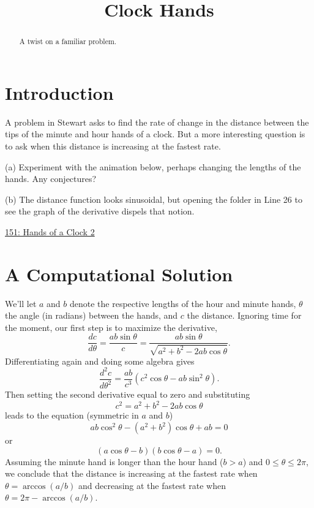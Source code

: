 \documentclass{ximera}
\title{Clock Hands}
\begin{document}
\begin{abstract}
A twist on a familiar problem.
\end{abstract}
\maketitle

\section*{Introduction}
A problem in Stewart asks to find the rate of change in the distance between the tips of the minute and hour hands of a clock. But a more interesting question is to ask when this distance is increasing at the fastest rate. 


\begin{exploration}
(a) Experiment with the animation below, perhaps changing the lengths of the hands. Any conjectures?

(b) The distance function looks sinusoidal, but opening the folder in Line 26 to see the graph of the derivative dispels that notion. 

\begin{onlineOnly}
    \begin{center}
\end{center}
\end{onlineOnly}

\href{https://www.desmos.com/calculator/pnpf5uhbre}{151: Hands of a Clock 2}


\end{exploration}

\section*{A Computational Solution}

We'll let $a$ and $b$ denote the respective lengths of the hour and minute hands, $\theta$ the angle (in radians) between the hands, and $c$ the distance. Ignoring time for the moment, our first step is to maximize the derivative,
\[
        \frac{dc}{d\theta} = \frac{ab\sin \theta}{c} = \frac{ab \sin \theta}{\sqrt{a^2+b^2-2ab\cos\theta}}.
\]
Differentiating again and doing some algebra gives
\[
       \frac{d^2c}{d\theta^2} = \frac{ab}{c^3} \left( c^2\cos\theta - ab\sin^2\theta  \right).
\]
Then setting the second derivative equal to zero and substituting 
\[
      c^2 = a^2+b^2-2ab\cos\theta
\]
leads to the equation (symmetric in $a$ and $b$)
\[
     ab \cos^2\theta - (a^2 + b^2)\cos\theta + ab = 0
\]
or
\[
              (a \cos \theta - b) (b \cos \theta - a) = 0 .
\]
Assuming the minute hand is longer than the hour hand ($b>a$) and $0\leq \theta \leq 2\pi$, we conclude that the distance is increasing at the fastest rate when $\theta = \arccos(a/b)$ and decreasing at the fastest rate when $\theta  = 2\pi - \arccos(a/b)$.
\end{document}
